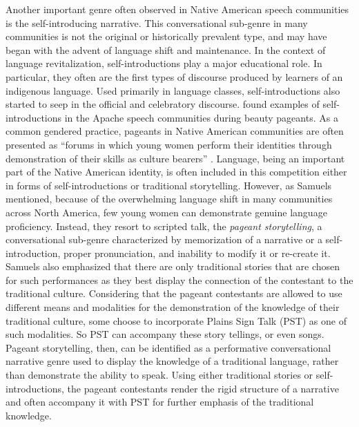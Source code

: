 \documentclass[12pt]{article}
\begin{document}
Another important genre often observed in Native American speech communities is the self-introducing narrative. This conversational sub-genre in many communities is not the original or historically prevalent type, and may have began with the advent of language shift and maintenance. In the context of language revitalization, self-introductions play a major educational role. In particular, they often are the first types of discourse produced by learners of an indigenous language. Used primarily in language classes, self-introductions also started to seep in the official and celebratory discourse. \textcite{samuels2004} found examples of self-introductions in the Apache speech communities during beauty pageants. As a common gendered practice, pageants in Native American communities are often presented as ``forums in which young women perform their identities through demonstration of their skills as culture bearers'' \parencite[p. 177]{samuels2004}. Language, being an important part of the Native American identity, is often included in this competition either in forms of self-introductions or traditional storytelling. However, as Samuels mentioned, because of the overwhelming language shift in many communities across North America, few young women can demonstrate genuine language proficiency. Instead, they resort to scripted talk, the \textit{pageant storytelling}, a conversational sub-genre characterized by memorization of a narrative or a self-introduction, proper pronunciation, and inability to modify it or re-create it. Samuels also emphasized that there are only traditional stories that are chosen for such performances as they best display the connection of the contestant to the traditional culture. Considering that the pageant contestants are allowed to use different means and modalities for the demonstration of the knowledge of their traditional culture, some choose to incorporate Plains Sign Talk (PST) as one of such modalities. So PST can accompany these story tellings, or even songs. Pageant storytelling, then, can be identified as a performative conversational narrative genre used to display the knowledge of a traditional language, rather than demonstrate the ability to speak. Using either traditional stories or self-introductions, the pageant contestants render the rigid structure of a narrative and often accompany it with PST for further emphasis of the traditional knowledge.
\end{document}
